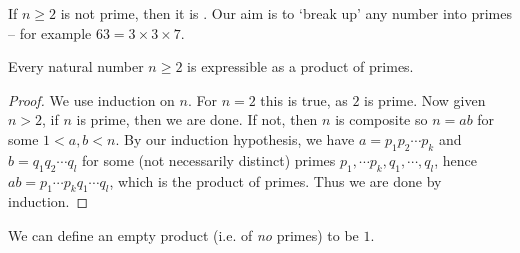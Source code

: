 \documentclass[a4]{scrartcl}
\begin{document}
If $n \geq 2$ is not prime, then it is . Our aim is to `break up' any number into primes -- for example $63 = 3 \times 3 \times 7$.


\begin{proposition}
	Every natural number $n \geq 2$ is expressible as a product of primes.
\end{proposition}
\begin{proof}
	We use induction on $n$. For $n = 2$ this is true, as $2$ is prime. Now given $n > 2$, if $n$ is prime, then we are done. If not, then $n$ is composite so $n = ab$ for some $1 < a, b < n$. By our induction hypothesis, we have $a = p_1 p_2 \cdots p_k$ and $b = q_1 q_2 \cdots q_l$ for some (not necessarily distinct) primes $p_1, \cdots p_k, q_1, \cdots, q_l$, hence $ab = p_1 \cdots p_k q_1 \cdots q_l$, which is the product of primes. Thus we are done by induction.
\end{proof}

\begin{remark}
	We can define an empty product (i.e. of \emph{no} primes) to be $1$.
\end{remark}






\end{document}
